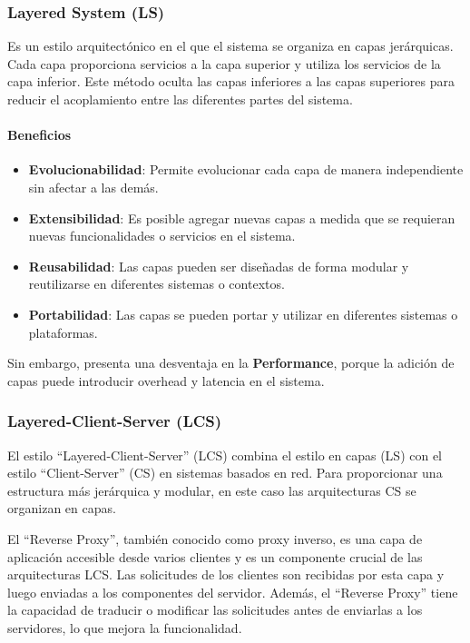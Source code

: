 \documentclass{article}
\begin{document}
		\subsubsection{Layered System (LS)}
		Es un estilo arquitectónico en el que el sistema se organiza en capas jerárquicas. Cada capa proporciona servicios a la capa superior y utiliza los servicios de la capa inferior. Este método oculta las capas inferiores a las capas superiores para reducir el acoplamiento entre las diferentes partes del sistema.
 		\paragraph{Beneficios}
		\begin{itemize}	
			\item {\textbf{Evolucionabilidad}}: Permite evolucionar cada capa de manera independiente sin afectar a las demás.
			
			\item {\textbf{Extensibilidad}}: Es posible agregar nuevas capas a medida que se requieran nuevas funcionalidades o servicios en el sistema.
			
			\item {\textbf{Reusabilidad}}: Las capas pueden ser diseñadas de forma modular y reutilizarse en diferentes sistemas o contextos.
			
			\item {\textbf{Portabilidad}}: Las capas se pueden portar y utilizar en diferentes sistemas o plataformas.
		\end{itemize}
		
		Sin embargo, presenta una desventaja en la \textbf{Performance}, porque la adición de capas puede introducir overhead y latencia en el sistema.
	
		
		
		
		\subsubsection{Layered-Client-Server (LCS)}
		El estilo ``Layered-Client-Server'' (LCS) combina el estilo en capas (LS) con el estilo ``Client-Server'' (CS) en sistemas basados en red. Para proporcionar una estructura más jerárquica y modular, en este caso las arquitecturas CS se organizan en capas.
		
		El ``Reverse Proxy'', también conocido como proxy inverso, es una capa de aplicación accesible desde varios clientes y es un componente crucial de las arquitecturas LCS. Las solicitudes de los clientes son recibidas por esta capa y luego enviadas a los componentes del servidor. Además, el ``Reverse Proxy'' tiene la capacidad de traducir o modificar las solicitudes antes de enviarlas a los servidores, lo que mejora la funcionalidad.
		
\end{document}
